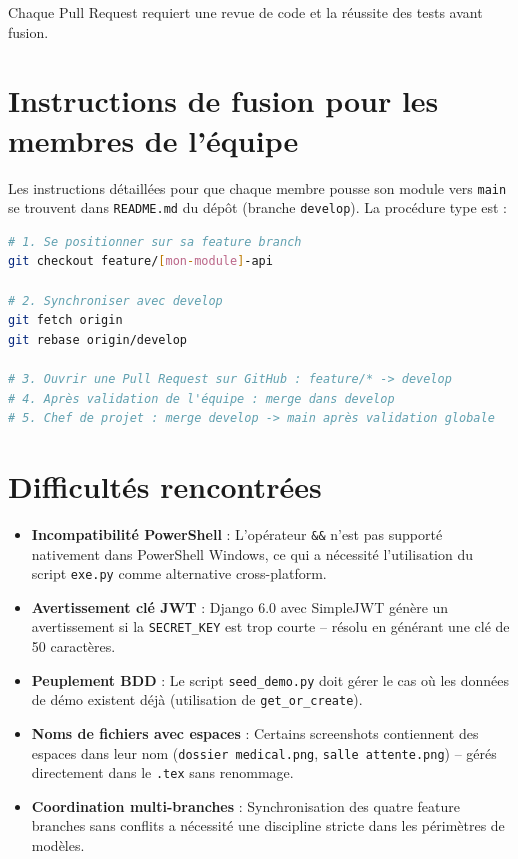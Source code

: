 \documentclass[12pt,a4paper]{report}
\begin{document}
Chaque Pull Request requiert une revue de code et la réussite des tests avant fusion.

\section{Instructions de fusion pour les membres de l'équipe}

Les instructions détaillées pour que chaque membre pousse son module vers \texttt{main} se trouvent dans \texttt{README.md} du dépôt (branche \texttt{develop}). La procédure type est :

\begin{lstlisting}[language=bash, caption={Procédure de contribution individuelle}]
# 1. Se positionner sur sa feature branch
git checkout feature/[mon-module]-api

# 2. Synchroniser avec develop
git fetch origin
git rebase origin/develop

# 3. Ouvrir une Pull Request sur GitHub : feature/* -> develop
# 4. Après validation de l'équipe : merge dans develop
# 5. Chef de projet : merge develop -> main après validation globale
\end{lstlisting}

\section{Difficultés rencontrées}

\begin{itemize}[leftmargin=*]
  \item \textbf{Incompatibilité PowerShell} : L'opérateur \texttt{\&\&} n'est pas supporté nativement dans PowerShell Windows, ce qui a nécessité l'utilisation du script \texttt{exe.py} comme alternative cross-platform.
  \item \textbf{Avertissement clé JWT} : Django 6.0 avec SimpleJWT génère un avertissement si la \texttt{SECRET\_KEY} est trop courte -- résolu en générant une clé de 50 caractères.
  \item \textbf{Peuplement BDD} : Le script \texttt{seed\_demo.py} doit gérer le cas où les données de démo existent déjà (utilisation de \texttt{get\_or\_create}).
  \item \textbf{Noms de fichiers avec espaces} : Certains screenshots contiennent des espaces dans leur nom (\texttt{dossier medical.png}, \texttt{salle attente.png}) -- gérés directement dans le \texttt{.tex} sans renommage.
  \item \textbf{Coordination multi-branches} : Synchronisation des quatre feature branches sans conflits a nécessité une discipline stricte dans les périmètres de modèles.
\end{itemize}
\end{document}

